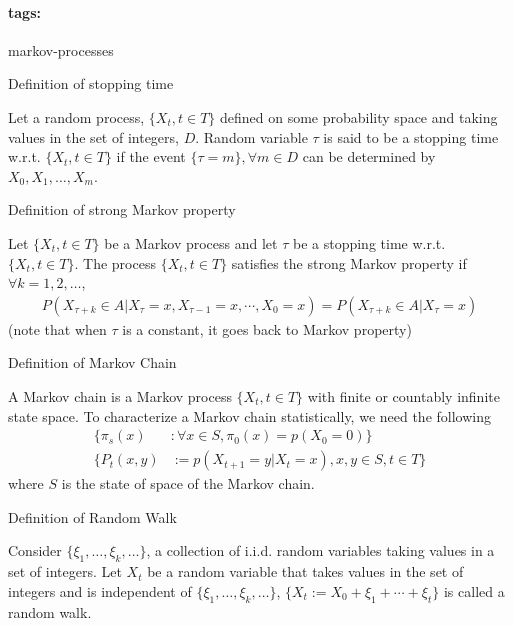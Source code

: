 \documentclass[11pt]{article}
\newcommand*{\tags}[1]{\paragraph{tags: }#1\bigskip}
\newcommand*{\xfield}[1]{\begin{mdframed}\centering #1\end{mdframed}\bigskip}
\newenvironment{field}{}{}
\newenvironment{note}{}{}
\begin{document}
%
\tags{markov-processes}
\begin{note}
  \xfield{Definition of stopping time}
  \begin{field}
    Let a random process, \(\{X_t, t \in T\}\) defined on
    some probability space and taking values in the set of
    integers, \(D\). Random variable \(\tau\) is said to be a stopping time
    w.r.t. \(\{X_t, t \in T\}\) if the event \(\{\tau = m\}, \forall m
    \in D\) can be determined by \(X_0, X_1, \ldots, X_m\).
  \end{field}
\end{note}
%
\begin{note}
  \xfield{Definition of strong Markov property}
  \begin{field}
    Let \(\{X_t, t \in T\}\) be a Markov process and let \(\tau\) be a
    stopping time w.r.t. \(\{X_t, t \in T\}\). The process \(\{X_t, t
    \in T\}\) satisfies the strong Markov property if \(\forall k =
    1,2,\ldots\),
    \begin{align*}
      P(X_{\tau+k} \in A | X_\tau = x, X_{\tau - 1} = x, \cdots, X_0 =
      x) = P(X_{\tau + k} \in A | X_\tau = x)
    \end{align*}
    (note that when \(\tau\) is a constant, it goes back to Markov property)
  \end{field}
\end{note}
%
\begin{note}
  \xfield{Definition of Markov Chain}
  \begin{field}
    A Markov chain is a Markov process \(\{X_t, t \in T\}\) with
    finite or countably infinite state space. To characterize a Markov
    chain statistically, we need the following
    \begin{align*}
      \{\pi_s(x) & : \forall x \in S, \pi_0(x) = p(X_0 = 0)\} \\
      \{P_t(x, y) & := p(X_{t+1} = y | X_t = x), x, y \in S, t \in T\}
    \end{align*}
    where \(S\) is the state of space of the Markov chain.
  \end{field}
\end{note}
%
\begin{note}
  \xfield{Definition of Random Walk}
  \begin{field}
    Consider \(\{\xi_1, \ldots, \xi_k, \ldots\}\), a collection of
    i.i.d. random variables taking values in a set of integers. Let
    \(X_t\) be a random variable that takes values in the set of
    integers and is independent of \(\{\xi_1, \ldots, \xi_k,
    \ldots\}\), \(\{X_t := X_0 + \xi_1 + \cdots + \xi_t\}\) is called
    a random walk.
  \end{field}
\end{note}
\end{document}
